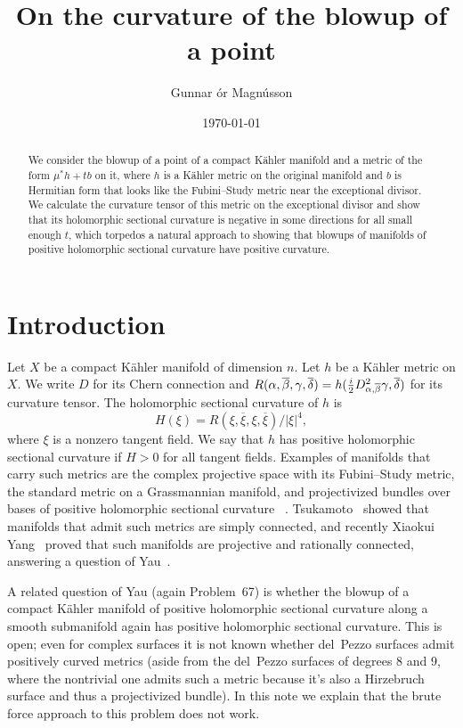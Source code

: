 \documentclass[10pt,a4paper]{amsart}
\author{Gunnar \TH\'or Magn\'usson}
\date{\today}
\title{On the curvature of the blowup of a point}
\def\fs{b}
\def\ov#1{\overline{#1}}
\def\hsc{holomorphic sectional curvature}
\begin{document}
\begin{abstract}
We consider the blowup of a point of a compact K\"ahler manifold and a metric
of the form $\mu^*h + t \fs$ on it, where $h$ is a K\"ahler metric on the
original manifold and $\fs$ is Hermitian form that looks like the
Fubini--Study metric near the exceptional divisor.
We calculate the curvature tensor of this metric on the exceptional divisor
and show that its holomorphic sectional curvature is negative in some
directions for all small enough $t$, which torpedos a natural approach to
showing that blowups of manifolds of positive holomorphic sectional curvature
have positive curvature.
\end{abstract}

\maketitle


\section*{Introduction}

Let $X$ be a compact K\"ahler manifold of dimension $n$.
Let $h$ be a K\"ahler metric on $X$.
We write $D$ for its Chern connection and
$R(\alpha,\ov\beta,\gamma,\ov\delta) = h(\frac i2
D^2_{\smash{\alpha,\ov\beta}}\gamma, \ov\delta)$ for its curvature tensor. The
holomorphic sectional curvature of $h$ is
$$
H(\xi)
= R(\xi, \ov\xi, \xi, \ov\xi)/|\xi|^4,
$$
where $\xi$ is a nonzero tangent field.
We say that $h$ has positive holomorphic sectional curvature if $H > 0$ for all
tangent fields.
Examples of manifolds that carry such metrics are the complex projective space
with its Fubini--Study metric, the standard metric on a Grassmannian manifold,
and projectivized bundles over bases of positive holomorphic sectional curvature
~\cite{alvarez2018projectivized}.
Tsukamoto~\cite{tsukamoto1957kahlerian} showed that manifolds that admit such
metrics are simply connected, and recently Xiaokui Yang~\cite{yang2017rc}
proved that such manifolds are projective and rationally connected, answering a
question of Yau~\cite[Problem~67]{yau1993open}.

A related question of Yau (again Problem~67) is whether the blowup of a compact
K\"ahler manifold of positive \hsc{} along a smooth submanifold again has
positive \hsc.
This is open; even for complex surfaces it is not known whether del~Pezzo
surfaces admit positively curved metrics (aside from the del~Pezzo surfaces of
degrees 8 and 9, where the nontrivial one admits such a metric because it's
also a Hirzebruch surface and thus a projectivized bundle). In this note we
explain that the brute force approach to this problem does not work.
\end{document}
